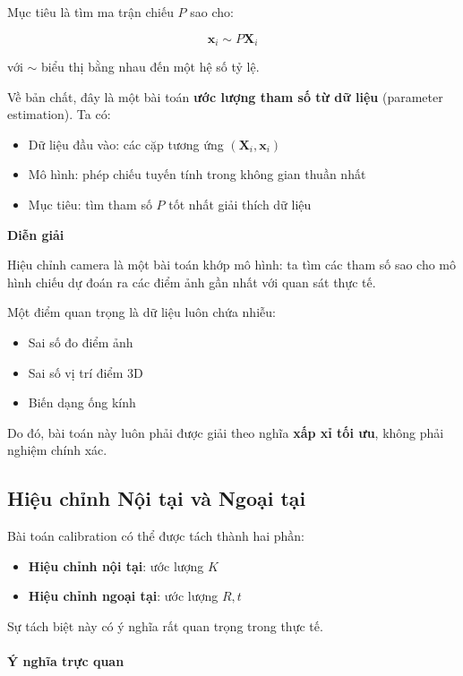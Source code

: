 Mục tiêu là tìm ma trận chiếu $P$ sao cho:

\[
\mathbf{x}_i \sim P \mathbf{X}_i
\]

với $\sim$ biểu thị bằng nhau đến một hệ số tỷ lệ.

Về bản chất, đây là một bài toán \textbf{ước lượng tham số từ dữ liệu} (parameter estimation). Ta có:
\begin{itemize}
	\item Dữ liệu đầu vào: các cặp tương ứng $(\mathbf{X}_i, \mathbf{x}_i)$
	\item Mô hình: phép chiếu tuyến tính trong không gian thuần nhất
	\item Mục tiêu: tìm tham số $P$ tốt nhất giải thích dữ liệu
\end{itemize}

\begin{mdframed}[style=infobox]
	\textbf{Diễn giải}
	
	Hiệu chỉnh camera là một bài toán khớp mô hình: ta tìm các tham số sao cho mô hình chiếu dự đoán ra các điểm ảnh gần nhất với quan sát thực tế.
\end{mdframed}

Một điểm quan trọng là dữ liệu luôn chứa nhiễu:
\begin{itemize}
	\item Sai số đo điểm ảnh
	\item Sai số vị trí điểm 3D
	\item Biến dạng ống kính
\end{itemize}

Do đó, bài toán này luôn phải được giải theo nghĩa \textbf{xấp xỉ tối ưu}, không phải nghiệm chính xác.

\subsection{Hiệu chỉnh Nội tại và Ngoại tại}
\label{subsec:intrinsic_extrinsic_calibration}

Bài toán calibration có thể được tách thành hai phần:

\begin{itemize}
	\item \textbf{Hiệu chỉnh nội tại}: ước lượng $K$
	\item \textbf{Hiệu chỉnh ngoại tại}: ước lượng $R, t$
\end{itemize}

Sự tách biệt này có ý nghĩa rất quan trọng trong thực tế.

\paragraph{Ý nghĩa trực quan}

